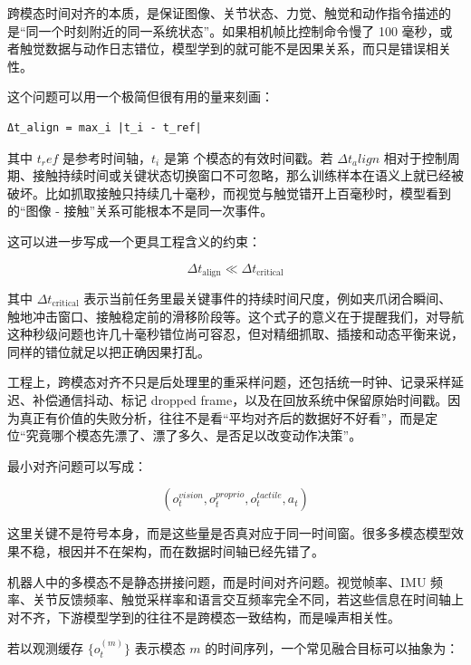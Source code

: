跨模态时间对齐的本质，是保证图像、关节状态、力觉、触觉和动作指令描述的是“同一个时刻附近的同一系统状态”。如果相机帧比控制命令慢了 100 毫秒，或者触觉数据与动作日志错位，模型学到的就可能不是因果关系，而只是错误相关性。

这个问题可以用一个极简但很有用的量来刻画：

\begin{lstlisting}
Δt_align = max_i |t_i - t_ref|
\end{lstlisting}

其中 \(t_ref\) 是参考时间轴，\(t_i\) 是第 \texttt{} 个模态的有效时间戳。若 \(\Delta t_align\) 相对于控制周期、接触持续时间或关键状态切换窗口不可忽略，那么训练样本在语义上就已经被破坏。比如抓取接触只持续几十毫秒，而视觉与触觉错开上百毫秒时，模型看到的“图像 - 接触”关系可能根本不是同一次事件。

这可以进一步写成一个更具工程含义的约束：

\begingroup
\footnotesize
\begin{equation*}
\Delta t_{\mathrm{align}} \ll \Delta t_{\mathrm{critical}}
\end{equation*}
\endgroup

其中 \(\Delta t_{\mathrm{critical}}\) 表示当前任务里最关键事件的持续时间尺度，例如夹爪闭合瞬间、触地冲击窗口、接触稳定前的滑移阶段等。这个式子的意义在于提醒我们，对导航这种秒级问题也许几十毫秒错位尚可容忍，但对精细抓取、插接和动态平衡来说，同样的错位就足以把正确因果打乱。

工程上，跨模态对齐不只是后处理里的重采样问题，还包括统一时钟、记录采样延迟、补偿通信抖动、标记 dropped frame，以及在回放系统中保留原始时间戳。因为真正有价值的失败分析，往往不是看“平均对齐后的数据好不好看”，而是定位“究竟哪个模态先漂了、漂了多久、是否足以改变动作决策”。

最小对齐问题可以写成：

\begin{equation*}
(o_t^{vision}, o_t^{proprio}, o_t^{tactile}, a_t)
\end{equation*}

这里关键不是符号本身，而是这些量是否真对应于同一时间窗。很多多模态模型效果不稳，根因并不在架构，而在数据时间轴已经先错了。

机器人中的多模态不是静态拼接问题，而是时间对齐问题。视觉帧率、IMU 频率、关节反馈频率、触觉采样率和语言交互频率完全不同，若这些信息在时间轴上对不齐，下游模型学到的往往不是跨模态一致结构，而是噪声相关性。

若以观测缓存 \(\{o_t^{(m)}\}\) 表示模态 \(m\) 的时间序列，一个常见融合目标可以抽象为：

